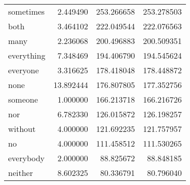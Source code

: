 \begin{table}[ht]
\begin{tabular}{lrrr}
sometimes & {\cellcolor[HTML]{FEFFD8}} \color[HTML]{000000} 2.449490 & {\cellcolor[HTML]{EAF7B1}} \color[HTML]{000000} 253.266658 & {\cellcolor[HTML]{EAF7B1}} \color[HTML]{000000} 253.278503 \\
both & {\cellcolor[HTML]{FDFED5}} \color[HTML]{000000} 3.464102 & {\cellcolor[HTML]{EFF9B5}} \color[HTML]{000000} 222.049544 & {\cellcolor[HTML]{EFF9B5}} \color[HTML]{000000} 222.076563 \\
many & {\cellcolor[HTML]{FEFFD8}} \color[HTML]{000000} 2.236068 & {\cellcolor[HTML]{F0F9B8}} \color[HTML]{000000} 200.496883 & {\cellcolor[HTML]{F1FABA}} \color[HTML]{000000} 200.509351 \\
everything & {\cellcolor[HTML]{FBFDD0}} \color[HTML]{000000} 7.348469 & {\cellcolor[HTML]{F1FABA}} \color[HTML]{000000} 194.406790 & {\cellcolor[HTML]{F1FABB}} \color[HTML]{000000} 194.545624 \\
everyone & {\cellcolor[HTML]{FEFFD6}} \color[HTML]{000000} 3.316625 & {\cellcolor[HTML]{F3FABD}} \color[HTML]{000000} 178.418048 & {\cellcolor[HTML]{F3FABD}} \color[HTML]{000000} 178.448872 \\
none & {\cellcolor[HTML]{F7FCC6}} \color[HTML]{000000} 13.892444 & {\cellcolor[HTML]{F3FABD}} \color[HTML]{000000} 176.807805 & {\cellcolor[HTML]{F3FABD}} \color[HTML]{000000} 177.352756 \\
someone & {\cellcolor[HTML]{FFFFD9}} \color[HTML]{000000} 1.000000 & {\cellcolor[HTML]{F4FBC0}} \color[HTML]{000000} 166.213718 & {\cellcolor[HTML]{F4FBC0}} \color[HTML]{000000} 166.216726 \\
nor & {\cellcolor[HTML]{FBFDD0}} \color[HTML]{000000} 6.782330 & {\cellcolor[HTML]{F7FCC7}} \color[HTML]{000000} 126.015872 & {\cellcolor[HTML]{F7FCC7}} \color[HTML]{000000} 126.198257 \\
without & {\cellcolor[HTML]{FDFED5}} \color[HTML]{000000} 4.000000 & {\cellcolor[HTML]{F8FCC9}} \color[HTML]{000000} 121.692235 & {\cellcolor[HTML]{F8FCC9}} \color[HTML]{000000} 121.757957 \\
no & {\cellcolor[HTML]{FDFED5}} \color[HTML]{000000} 4.000000 & {\cellcolor[HTML]{F8FCCA}} \color[HTML]{000000} 111.458512 & {\cellcolor[HTML]{F8FCCA}} \color[HTML]{000000} 111.530265 \\
everybody & {\cellcolor[HTML]{FEFFD8}} \color[HTML]{000000} 2.000000 & {\cellcolor[HTML]{FAFDCF}} \color[HTML]{000000} 88.825672 & {\cellcolor[HTML]{FAFDCF}} \color[HTML]{000000} 88.848185 \\
neither & {\cellcolor[HTML]{FAFDCE}} \color[HTML]{000000} 8.602325 & {\cellcolor[HTML]{FBFDD0}} \color[HTML]{000000} 80.336791 & {\cellcolor[HTML]{FBFDD0}} \color[HTML]{000000} 80.796040 \\

\end{tabular}
\end{table}
